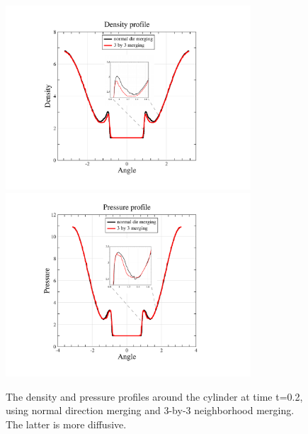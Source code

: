 \begin{figure}
\begin{center}
\hspace*{-.5in}
\includegraphics[height=2.7in,trim=90 70 220 60,clip]{figs/densityWithZoom.pdf}
\hspace*{.3in}
\includegraphics[height=2.7in,trim=120 70 230 50,clip]{figs/pressureWithZoom.pdf}
\caption{\sf The density and pressure profiles around the cylinder at time
t=0.2,  using normal direction merging and 3-by-3 neighborhood merging.
The latter is more diffusive.}
\label{fig:cyl2}
\end{center}
\end{figure}


